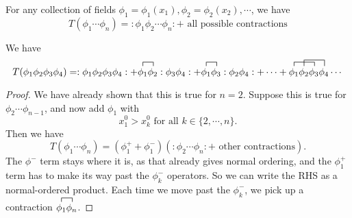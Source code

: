 \documentclass[a4paper]{article}
\begin{document}
\begin{thm}
  For any collection of fields $\phi_1 = \phi_1(x_1), \phi_2 = \phi_2(x_2), \cdots$, we have
  \[
    T(\phi_1 \cdots \phi_n) = :\phi_1 \phi_2 \cdots \phi_n: + \text{ all possible contractions}
  \]
\end{thm}

\begin{eg}
  We have
  \[
    T(\phi_1 \phi_2 \phi_3 \phi_4) = :\phi_1 \phi_2 \phi_3 \phi_4: + \contraction{}{\phi_1}{}{\phi_2}\phi_1 \phi_2 : \phi_3 \phi_4: + \contraction{}{\phi_1}{}{\phi_3}\phi_1 \phi_3:\phi_2 \phi_4: + \cdots + \contraction{}{\phi_1}{\phi_2}{\phi_3}\contraction[1.5ex]{\phi_1}{\phi_2}{\phi_3}{\phi_4}\phi_1\phi_2\phi_3\phi_4\cdots
  \]
\end{eg}

\begin{proof}
  We have already shown that this is true for $n = 2$. Suppose this is true for $\phi_2 \cdots \phi_{n - 1}$, and now add $\phi_1$ with
  \[
    x_1^0 > x_k^0 \text{ for all }k \in \{2, \cdots, n\}.
  \]
  Then we have
  \[
    T(\phi_1 \cdots \phi_n) = (\phi_1^+ + \phi_1^-)(:\phi_2 \cdots \phi_n: + \text{ other contractions}).
  \]
  The $\phi^-$ term stays where it is, as that already gives normal ordering, and the $\phi_1^+$ term has to make its way past the $\phi_k^-$ operators. So we can write the RHS as a normal-ordered product. Each time we move past the $\phi_k^-$, we pick up a contraction $\contraction{}{\phi_1}{}{\phi_n}\phi_1\phi_n$.
\end{proof}
\end{document}
